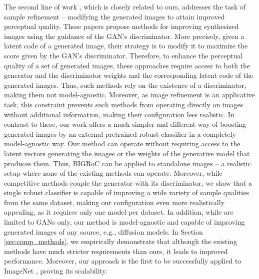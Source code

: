 \documentclass[10pt]{article} \usepackage[accepted]{tmlr}
\begin{document}
The second line of work \citep{tanaka2019discriminator, che2021gan, ansari2021refining}, which is closely related to ours, addresses the task of sample refinement -- modifying the generated images to attain improved perceptual quality.
These papers propose methods for improving synthesized images using the guidance of the GAN's discriminator.
More precisely, given a latent code of a generated image, their strategy is to modify it to maximize the score given by the GAN's discriminator.
Therefore, to enhance the perceptual quality of a set of generated images, these approaches require access to both the generator and the discriminator weights and the corresponding latent code of the generated images. Thus, such methods rely on the existence of a discriminator, making them not model-agnostic.
Moreover, as image refinement is an applicative task, this constraint prevents such methods from operating directly on images without additional information, making their configuration less realistic.
In contrast to these, our work offers a much simpler and different way of boosting generated images by an external pretrained robust classifier in a completely model-agnostic way. Our method can operate without requiring access to the latent vectors generating the images or the weights of the generative model that produces them. Thus, BIGRoC can be applied to standalone images -- a realistic setup where none of the existing methods can operate.
Moreover, while competitive methods couple the generator with its discriminator, we show that a single robust classifier is capable of improving a wide variety of sample qualities from the same dataset, making our configuration even more realistically appealing, as it requires only one model per dataset.
In addition, while \citep{tanaka2019discriminator, che2021gan} are limited to GANs only, our method is model-agnostic and capable of improving generated images of any source, e.g., diffusion models.
In Section \ref{sec:comp_methods}, we empirically demonstrate that although the existing methods have much stricter requirements than ours, it leads to improved performance. Moreover, our approach is the first to be successfully applied to ImageNet , proving its scalability.
\end{document}
